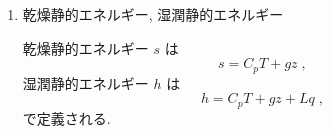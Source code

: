 \begin{enumerate}
(\ref{e-sat})より,
%
\begin{equation}
\DP{q^*}{T} = \frac{L}{R_v T^2} q^*(T,p) .
\end{equation}

ここで, 温度が氷点 273.15K よりも低い場合には,
潜熱 $L$ として昇華の潜熱 $L+L_M$ を用いる.

\item 乾燥静的エネルギー, 湿潤静的エネルギー

乾燥静的エネルギー $s$ は
\begin{equation}
  s = C_p T + g z \; ,
\end{equation}
%
湿潤静的エネルギー $h$ は
\begin{equation}
  h = C_p T + g z + L q \; ,
\end{equation}
で定義される.

\end{enumerate}
